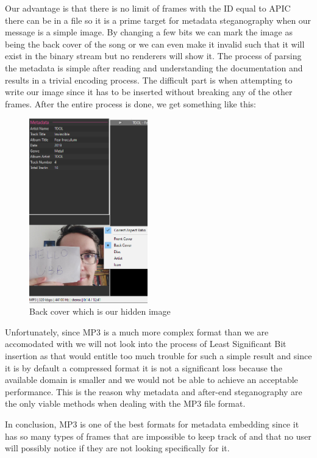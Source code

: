 \begin{multicols*}{2}
Our advantage is that there is no limit of frames with the ID equal to APIC there can be in a file so it is a prime target for metadata steganography when our message is a simple image. By changing a few bits we can mark the image as being the back cover of the song or we can even make it invalid such that it will exist in the binary stream but no renderers will show it. The process of parsing the metadata is simple after reading and understanding the documentation and results in a trivial encoding process. The difficult part is when attempting to write our image since it has to be inserted without breaking any of the other frames. After the entire process is done, we get something like this:
\begin{figure}[H]
    \centering
    \includegraphics[height=8cm,keepaspectratio]{pics/audio_chapter/tool_backcover_example.png}
    \caption{Back cover which is our hidden image}
\end{figure}

Unfortunately, since MP3 is a much more complex format than we are accomodated with we will not look into the process of Least Significant Bit insertion as that would entitle too much trouble for such a simple result and since it is by default a compressed format it is not a significant loss because the available domain is smaller and we would not be able to achieve an acceptable performance. This is the reason why metadata and after-end steganography are the only viable methods when dealing with the MP3 file format.

In conclusion, MP3 is one of the best formats for metadata embedding since it has so many types of frames that are impossible to keep track of and that no user will possibly notice if they are not looking specifically for it. 
\end{multicols*}